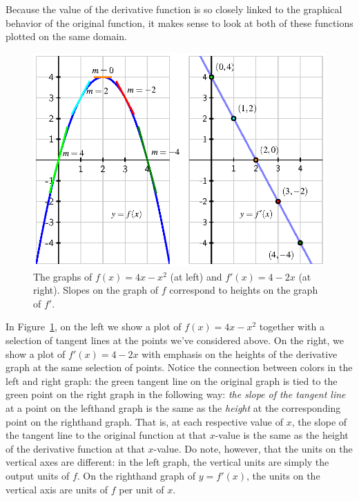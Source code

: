 Because the value of the derivative function is so closely linked to the graphical behavior of the original function, it makes sense to look at both of these functions plotted on the same domain.  
\begin{figure}[h]
\begin{center}
\includegraphics{figures/1_4_ffprimeplot.eps}
\caption{The graphs of $f(x) = 4x - x^2$ (at left) and $f'(x) = 4 - 2x$ (at right).  Slopes on the graph of $f$ correspond to heights on the graph of $f'$.} \label{F:1.4.ffprime}
\end{center}
\end{figure}
In Figure~\ref{F:1.4.ffprime}, on the left we show a plot of $f(x) = 4x - x^2$ together with a selection of tangent lines at the points we've considered above.  On the right, we show a plot of $f'(x) = 4 - 2x$ with emphasis on the heights of the derivative graph at the same selection of points.  Notice the connection between colors in the left and right graph:  the green tangent line on the original graph is tied to the green point on the right graph in the following way:  \emph{the slope of the tangent line} at a point on the lefthand graph is the same as the \emph{height} at the corresponding point on the righthand graph.  That is, at each respective value of $x$, the slope of the tangent line to the original function at that $x$-value is the same as the height of the derivative function at that $x$-value.  Do note, however, that the units on the vertical axes are different:  in the left graph, the vertical units are simply the output units of $f$.  On the righthand graph of $y = f'(x)$, the units on the vertical axis are units of $f$ per unit of $x$.

